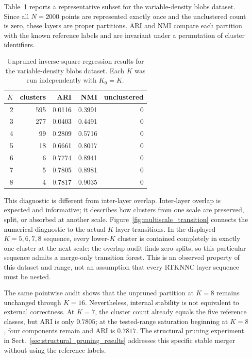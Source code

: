 \documentclass[pdflatex,sn-mathphys-num]{sn-jnl}
\begin{document}
Table~\ref{tab:partition_diagnostic} reports a representative subset for the variable-density blobs dataset. Since all $N=2000$ points are represented exactly once and the unclustered count is zero, these layers are proper partitions. ARI and NMI compare each partition with the known reference labels and are invariant under a permutation of cluster identifiers.

\begin{table}[t]
\caption{Unpruned inverse-square regression results for the variable-density blobs dataset. Each $K$ was run independently with $K_0=K$.}\label{tab:partition_diagnostic}
\centering
\begin{tabular}{rrrrr}
\toprule
$K$ & clusters & ARI & NMI & unclustered\\
\midrule
2 & 595 & 0.0116 & 0.3991 & 0\\
3 & 277 & 0.0403 & 0.4491 & 0\\
4 & 99  & 0.2809 & 0.5716 & 0\\
5 & 18  & 0.6661 & 0.8017 & 0\\
6 & 6   & 0.7774 & 0.8941 & 0\\
7 & 5   & 0.7805 & 0.8981 & 0\\
8 & 4   & 0.7817 & 0.9035 & 0\\
\bottomrule
\end{tabular}
\end{table}

This diagnostic is different from inter-layer overlap. Inter-layer overlap is
expected and informative; it describes how clusters from one scale are
preserved, split, or absorbed at another scale.  Figure~\ref{fig:multiscale_transition}
connects the numerical diagnostic to the actual $K$-layer transitions.  In the
displayed $K=5,6,7,8$ sequence, every lower-$K$ cluster is contained completely
in exactly one cluster at the next scale: the overlap audit finds zero splits,
so this particular sequence admits a merge-only transition forest.  This is an
observed property of this dataset and range, not an assumption that every
RTKNNC layer sequence must be nested.

The same pointwise audit shows that the unpruned partition at $K=8$ remains
unchanged through $K=16$. Nevertheless, internal stability is not equivalent
to external correctness.  At $K=7$, the cluster count already equals the five
reference classes, but ARI is only $0.7805$; at the tested-range saturation
beginning at $K=8$, four components remain and ARI is $0.7817$.  The structural
pruning experiment in Sect.~\ref{sec:structural_pruning_results} addresses this
specific stable merger without using the reference labels.
\end{document}
